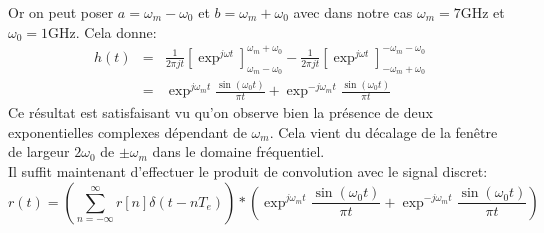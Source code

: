 \documentclass[10pt,a4paper]{article}
\begin{document}
Or on peut poser $a=\omega_m-\omega_0$ et $b=\omega_m+\omega_0$ avec dans notre cas $\omega_m=7\text{GHz}$ et $\omega_0=1\text{GHz}$. Cela donne:
\begin{eqnarray*}
h(t) & = &\frac{1}{2\pi j t}\left[ \exp^{j\omega t}\right]_{\omega_m-\omega_0}^{\omega_m+\omega_0} - \frac{1}{2\pi j t}\left[ \exp^{j\omega t}\right]_{-\omega_m+\omega_0}^{-\omega_m-\omega_0}\\
& = & \exp^{j\omega_m t}\frac{\sin (\omega_0 t)}{\pi t} + \exp^{-j\omega_m t}\frac{\sin (\omega_0 t)}{\pi t}
\end{eqnarray*}
Ce résultat est satisfaisant vu qu'on observe bien la présence de deux exponentielles complexes dépendant de $\omega_m$. Cela vient du décalage de la fenêtre de largeur $2\omega_0$ de $\pm \omega_m$ dans le domaine fréquentiel.\\
Il suffit maintenant d'effectuer le produit de convolution avec le signal discret:
\begin{equation}
r(t)=\left(\sum_{n=-\infty}^{\infty}r[n]\delta (t-nT_e)\right)\ast \left( \exp^{j\omega_m t}\frac{\sin (\omega_0 t)}{\pi t} + \exp^{-j\omega_m t}\frac{\sin (\omega_0 t)}{\pi t} \right)
\end{equation}
\end{document}
